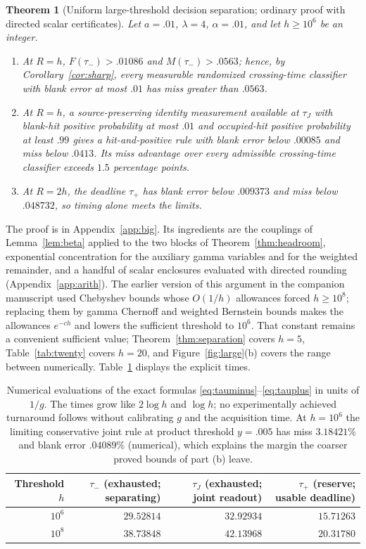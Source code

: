 \documentclass[11pt,a4paper]{article}
\theoremstyle{plain}
\newtheorem{theorem}{Theorem}[section]
\theoremstyle{definition}
\theoremstyle{remark}
\begin{document}
\begin{theorem}[Uniform large-threshold decision separation; ordinary proof with directed scalar certificates]\label{thm:big}
Let $a=.01$, $\lambda=4$, $\alpha=.01$, and let $h\ge10^{6}$ be an integer.
\begin{enumerate}[label=(\alph*)]
\item At $R=h$, $F(\tau_-)>.01086$ and $M(\tau_-)>.0563$; hence, by Corollary~\ref{cor:sharp}, every measurable randomized crossing-time classifier with blank error at most $.01$ has miss greater than $.0563$.
\item At $R=h$, a source-preserving identity measurement available at $\tau_J$ with blank-hit positive probability at most $.01$ and occupied-hit positive probability at least $.99$ gives a hit-and-positive rule with blank error below $.00085$ and miss below $.0413$. Its miss advantage over every admissible crossing-time classifier exceeds $1.5$ percentage points.
\item At $R=2h$, the deadline $\tau_+$ has blank error below $.009373$ and miss below $.048732$, so timing alone meets the limits.
\end{enumerate}
\end{theorem}
The proof is in Appendix~\ref{app:big}. Its ingredients are the couplings of Lemma~\ref{lem:beta} applied to the two blocks of Theorem~\ref{thm:headroom}, exponential concentration for the auxiliary gamma variables and for the weighted remainder, and a handful of scalar enclosures evaluated with directed rounding (Appendix~\ref{app:arith}). The earlier version of this argument in the companion manuscript used Chebyshev bounds whose $O(1/h)$ allowances forced $h\ge10^{8}$; replacing them by gamma Chernoff and weighted Bernstein bounds makes the allowances $e^{-ch}$ and lowers the sufficient threshold to $10^{6}$. That constant remains a convenient sufficient value; Theorem~\ref{thm:separation} covers $h=5$, Table~\ref{tab:twenty} covers $h=20$, and Figure~\ref{fig:large}(b) covers the range between numerically. Table~\ref{tab:times} displays the explicit times.

\begin{table}[htbp]\centering\footnotesize\setlength{\tabcolsep}{5pt}
\begin{tabular}{rrrr}\toprule
Threshold $h$ & $\tau_-$ (exhausted; separating) & $\tau_J$ (exhausted; joint readout) & $\tau_+$ (reserve; usable deadline)\\\midrule
$10^{6}$ & $29.52814$ & $32.92934$ & $15.71263$\\
$10^{8}$ & $38.73848$ & $42.13968$ & $20.31780$\\\bottomrule
\end{tabular}
\caption{Numerical evaluations of the exact formulas \eqref{eq:tauminus}--\eqref{eq:tauplus} in units of $1/g$. The times grow like $2\log h$ and $\log h$; no experimentally achieved turnaround follows without calibrating $g$ and the acquisition time. At $h=10^{6}$ the limiting conservative joint rule at product threshold $y=.005$ has miss $3.18421\%$ and blank error $.04089\%$ (numerical), which explains the margin the coarser proved bounds of part (b) leave.}\label{tab:times}
\end{table}
\end{document}
